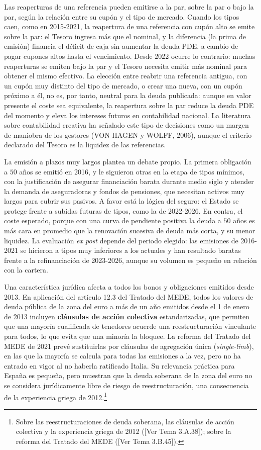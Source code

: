 \documentclass[10pt,a4paper]{article}
\newcommand{\authorfont}[1]{{\fontfamily{EBGaramond-TLF}\selectfont #1}}
\begin{document}
Las reaperturas de una referencia pueden emitirse a la par, sobre la par o bajo la par, según la relación entre su cupón y el tipo de mercado. Cuando los tipos caen, como en 2015-2021, la reapertura de una referencia con cupón alto se emite sobre la par: el Tesoro ingresa más que el nominal, y la diferencia (la prima de emisión) financia el déficit de caja sin aumentar la deuda PDE, a cambio de pagar cupones altos hasta el vencimiento. Desde 2022 ocurre lo contrario: muchas reaperturas se emiten bajo la par y el Tesoro necesita emitir más nominal para obtener el mismo efectivo. La elección entre reabrir una referencia antigua, con un cupón muy distinto del tipo de mercado, o crear una nueva, con un cupón próximo a él, no es, por tanto, neutral para la deuda publicada: aunque en valor presente el coste sea equivalente, la reapertura sobre la par reduce la deuda PDE del momento y eleva los intereses futuros en contabilidad nacional. La literatura sobre contabilidad creativa ha señalado este tipo de decisiones como un margen de maniobra de los gestores (VON HAGEN y WOLFF, 2006), aunque el criterio declarado del Tesoro es la liquidez de las referencias.

La emisión a plazos muy largos plantea un debate propio. La primera obligación a $50$ años se emitió en 2016, y le siguieron otras en la etapa de tipos mínimos, con la justificación de asegurar financiación barata durante medio siglo y atender la demanda de aseguradoras y fondos de pensiones, que necesitan activos muy largos para cubrir sus pasivos. A favor está la lógica del seguro: el Estado se protege frente a subidas futuras de tipos, como la de 2022-2026. En contra, el coste esperado, porque con una curva de pendiente positiva la deuda a $50$ años es más cara en promedio que la renovación sucesiva de deuda más corta, y su menor liquidez. La evaluación \textit{ex post} depende del periodo elegido: las emisiones de 2016-2021 se hicieron a tipos muy inferiores a los actuales y han resultado baratas frente a la refinanciación de 2023-2026, aunque su volumen es pequeño en relación con la cartera.

Una característica jurídica afecta a todos los bonos y obligaciones emitidos desde 2013. En aplicación del artículo 12.3 del Tratado del MEDE, todos los valores de deuda pública de la zona del euro a más de un año emitidos desde el 1 de enero de 2013 incluyen \textbf{cláusulas de acción colectiva} estandarizadas, que permiten que una mayoría cualificada de tenedores acuerde una reestructuración vinculante para todos, lo que evita que una minoría la bloquee. La reforma del Tratado del MEDE de 2021 prevé sustituirlas por cláusulas de agregación única (\textit{single-limb}), en las que la mayoría se calcula para todas las emisiones a la vez, pero no ha entrado en vigor al no haberla ratificado Italia. Su relevancia práctica para España es pequeña, pero muestran que la deuda soberana de la zona del euro no se considera jurídicamente libre de riesgo de reestructuración, una consecuencia de la experiencia griega de 2012.\footnote{Sobre las reestructuraciones de deuda soberana, las cláusulas de acción colectiva y la experiencia griega de 2012 ([\authorfont{Ver Tema 3.A.38}]); sobre la reforma del Tratado del MEDE ([\authorfont{Ver Tema 3.B.45}]).
}
\end{document}
